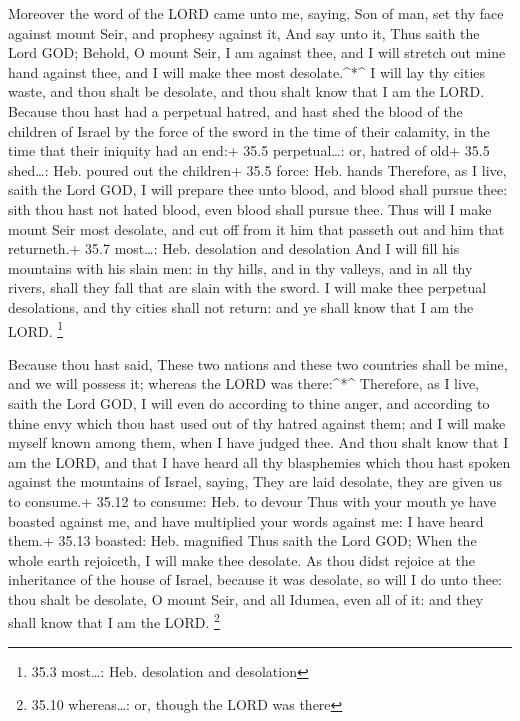  Moreover the word of the LORD came unto me, saying,
 Son of man, set thy face against mount Seir, and prophesy
against it,  And say unto it, Thus saith the Lord GOD;
Behold, O mount Seir, I am against thee, and I will stretch out mine
hand against thee, and I will make thee most desolate.\^{}*\^{}
 I will lay thy cities waste, and thou shalt be desolate,
and thou shalt know that I am the LORD.  Because thou hast
had a perpetual hatred, and hast shed the blood of the children of
Israel by the force of the sword in the time of their calamity, in the
time that their iniquity had an end:+ 35.5 perpetual\ldots: or, hatred
of old+ 35.5 shed\ldots: Heb. poured out the children+ 35.5 force: Heb.
hands  Therefore, as I live, saith the Lord GOD, I will
prepare thee unto blood, and blood shall pursue thee: sith thou hast not
hated blood, even blood shall pursue thee.  Thus will I make
mount Seir most desolate, and cut off from it him that passeth out and
him that returneth.+ 35.7 most\ldots: Heb. desolation and desolation
 And I will fill his mountains with his slain men: in thy
hills, and in thy valleys, and in all thy rivers, shall they fall that
are slain with the sword.  I will make thee perpetual
desolations, and thy cities shall not return: and ye shall know that I
am the LORD. \footnote{35.3 most\ldots: Heb. desolation and desolation}

 Because thou hast said, These two nations and these two
countries shall be mine, and we will possess it; whereas the LORD was
there:\^{}*\^{}  Therefore, as I live, saith the Lord GOD,
I will even do according to thine anger, and according to thine envy
which thou hast used out of thy hatred against them; and I will make
myself known among them, when I have judged thee.  And thou
shalt know that I am the LORD, and that I have heard all thy blasphemies
which thou hast spoken against the mountains of Israel, saying, They are
laid desolate, they are given us to consume.+ 35.12 to consume: Heb. to
devour  Thus with your mouth ye have boasted against me,
and have multiplied your words against me: I have heard them.+ 35.13
boasted: Heb. magnified  Thus saith the Lord GOD; When the
whole earth rejoiceth, I will make thee desolate.  As thou
didst rejoice at the inheritance of the house of Israel, because it was
desolate, so will I do unto thee: thou shalt be desolate, O mount Seir,
and all Idumea, even all of it: and they shall know that I am the LORD.
\footnote{35.10 whereas\ldots: or, though the LORD was there}

